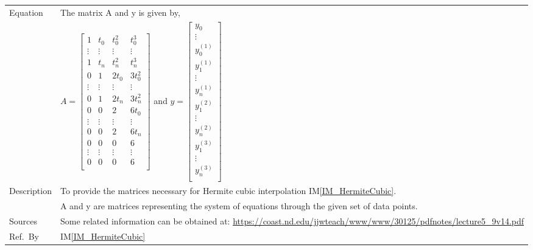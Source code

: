 \documentclass[12pt]{article}
\newcommand{\colAwidth}{0.13\textwidth}
\newcommand{\colBwidth}{0.82\textwidth}
\newcommand{\iref}[1]{IM\ref{#1}}
\begin{document}
\begin{minipage}{\textwidth}
\begin{tabular}{| p{\colAwidth} | p{\colBwidth}|}
		Equation
		&The matrix A and y is given by,\\
		&$
		A = \begin{bmatrix}
		1          & t_0       & t_0 ^{2}         & t_0 ^{3}         \\
		\vdots     & \vdots    & \vdots           & \vdots            \\
		1          & t_n       & t_n ^{2}         & t_n ^{3}          \\
		0          & 1         & 2 t_0            & 3 t_0 ^{2}         \\
		\vdots     & \vdots    & \vdots           & \vdots            \\
		0          & 1         & 2 t_n            & 3 t_n ^{2}          \\
		0          & 0         & 2                & 6 t_0              \\
		\vdots     & \vdots    & \vdots           & \vdots            \\
		0          & 0         & 2                & 6 t_n           \\
		0          & 0         & 0                & 6                 \\
		\vdots     & \vdots    & \vdots           & \vdots            \\
		0          & 0         & 0                & 6               \\
		\end{bmatrix}$ and $y = \begin{bmatrix}
		y_0  \\
		\vdots \\
		y_0 ^{(1)} \\
		y_1 ^{(1)} \\
		\vdots \\
		y_n ^{(1)} \\
		y_1 ^{(2)} \\
		\vdots \\
		y_n ^{(2)} \\  
		y_1 ^{(3)} \\
		\vdots \\
		y_n ^{(3)} \\ 
		\end{bmatrix}
		$ \\
		\hline
		Description 
		&To provide the matrices necessary for Hermite cubic interpolation \iref{IM_HermiteCubic}.\\
		&A and y are matrices representing the system of equations through the given set of data points.\\
		\hline
		
		Sources
		& Some related information can be obtained at: \url{https://coast.nd.edu/jjwteach/www/www/30125/pdfnotes/lecture5_9v14.pdf}\\
		\hline
		
		Ref.\ By 
		& \iref{IM_HermiteCubic}\\
		\hline
		
	\end{tabular}
\end{minipage}\\
\end{document}
